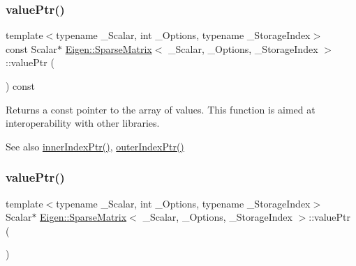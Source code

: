 \subsubsection{\texorpdfstring{valuePtr()}{valuePtr()}\hspace{0.1cm}{\footnotesize\ttfamily [1/2]}}
{\footnotesize\ttfamily template$<$typename \+\_\+\+Scalar, int \+\_\+\+Options, typename \+\_\+\+Storage\+Index$>$ \\
const Scalar$\ast$ \mbox{\hyperlink{class_eigen_1_1_sparse_matrix}{Eigen\+::\+Sparse\+Matrix}}$<$ \+\_\+\+Scalar, \+\_\+\+Options, \+\_\+\+Storage\+Index $>$\+::value\+Ptr (\begin{DoxyParamCaption}{ }\end{DoxyParamCaption}) const\hspace{0.3cm}{\ttfamily [inline]}}

\begin{DoxyReturn}{Returns}
a const pointer to the array of values. This function is aimed at interoperability with other libraries. 
\end{DoxyReturn}
\begin{DoxySeeAlso}{See also}
\mbox{\hyperlink{class_eigen_1_1_sparse_matrix_a8e9ef5d399d36fdd860ad05cb7a31455}{inner\+Index\+Ptr()}}, \mbox{\hyperlink{class_eigen_1_1_sparse_matrix_a9451af2795c1a5b97678272475e41422}{outer\+Index\+Ptr()}} 
\end{DoxySeeAlso}
\mbox{\label{class_eigen_1_1_sparse_matrix_ac2684952b14b5c9b0f68ae3bb8c517a6}} 
\subsubsection{\texorpdfstring{valuePtr()}{valuePtr()}\hspace{0.1cm}{\footnotesize\ttfamily [2/2]}}
{\footnotesize\ttfamily template$<$typename \+\_\+\+Scalar, int \+\_\+\+Options, typename \+\_\+\+Storage\+Index$>$ \\
Scalar$\ast$ \mbox{\hyperlink{class_eigen_1_1_sparse_matrix}{Eigen\+::\+Sparse\+Matrix}}$<$ \+\_\+\+Scalar, \+\_\+\+Options, \+\_\+\+Storage\+Index $>$\+::value\+Ptr (\begin{DoxyParamCaption}{ }\end{DoxyParamCaption})\hspace{0.3cm}{\ttfamily [inline]}}

